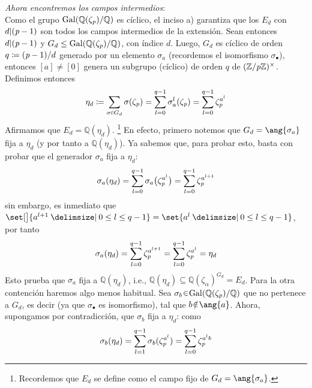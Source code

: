 \begin{sol}
\begin{enumerate}[label=\alph*)]
\emph{Ahora encontremos los campos intermedios}:\\
Como el grupo $\operatorname{Gal}(\mathbb{Q}(\zeta_{\operatorname{\textit{p}}})/ \mathbb{Q})$ es cíclico, el inciso a) garantiza que los $E_d$ con $d|({\operatorname{\textit{p}}}-1)$ son todos los campos intermedios de la extensión. Sean entonces $d | ({\operatorname{\textit{p}}}-1)$ y $G_d \leq \operatorname{Gal}(\mathbb{Q}(\zeta_{\operatorname{\textit{p}}})/\mathbb{Q})$, con índice $d$. Luego, $G_d$ es cíclico de orden $q \coloneq({\operatorname{\textit{p}}}-1)/d$ generado por un elemento $\sigma_a$ (recordemos el isomorfismo $\sigma_{\bullet}$), entonces $[a] \neq [0]$ genera un subgrupo (cíclico) de orden $q$ de $(\mathbb{Z}/{\operatorname{\textit{p}}}\mathbb{Z})^\times$. Definimos entonces
\[
\eta_d \coloneq \sum_{\sigma\en G_d} \sigma(\zeta_{\p}) = \sum^{q-1}_{l=0} \sigma^l_a(\zeta_{\p}) = \sum^{q-1}_{l=0} \zeta^{a^l}_{\p}
\]
Afirmamos que $E_d = \mathbb{Q}(\eta_d)$.%
\footnote{
    Recordemos que $E_d$ se define como el campo fijo de $G_d = \ang{\sigma_a}$.
}
En efecto, primero notemos que $G_d = \ang{\sigma_a}$ fija a $\eta_d$ (y por tanto a $\mathbb{Q}(\eta_d)$). Ya sabemos que, para probar esto, basta con probar que el generador $\sigma_a$ fija a $\eta_d$: 
\[
\sigma_a(\eta_d)%
=\sum^{q-1}_{l=0} \sigma_a\big(\zeta^{a^l}_{\p}\big)%
=\sum^{q-1}_{l=0} \zeta^{a^{l+1}}_{\p}
\]
sin embargo, es inmediato que $\set[\big]{a^{l+1} \given 0 \leq l \leq q-1} = \set{a^{l} \given 0 \leq l \leq q-1}$, por tanto 
\[
\sigma_a(\eta_d)%
=\sum^{q-1}_{l=0} \zeta^{a^{l+1}}_{\p} = \sum^{q-1}_{l=0} \zeta^{a^l}_{\p} = \eta_d
\]
Esto prueba que $\sigma_a$ fija a $\mathbb{Q}(\eta_d)$, i.e., $\mathbb{Q}(\eta_d) \subseteq \mathbb{Q}(\zeta_\alpha)^{G_d} = E_d$. Para la otra contención haremos algo menos habitual. Sea $\sigma_b \en \gal(\mathbb{Q}(\zeta_{\p})/\mathbb{Q})$ que no pertenece a $G_d$, es decir (ya que $\sigma_{\bullet}$ es isomorfismo), tal que $b \noten \ang{a}$. Ahora, supongamos por contradicción, que $\sigma_b$ fija a $\eta_d$: como
\[
\sigma_b(\eta_d) = \sum^{q-1}_{l=1} \sigma_b(\zeta^{a^l}_{\operatorname{\textit{p}}}) = \sum^{q-1}_{l=0} \zeta^{a^lb}_{\operatorname{\textit{p}}}
\]

\end{enumerate}
\end{sol}
